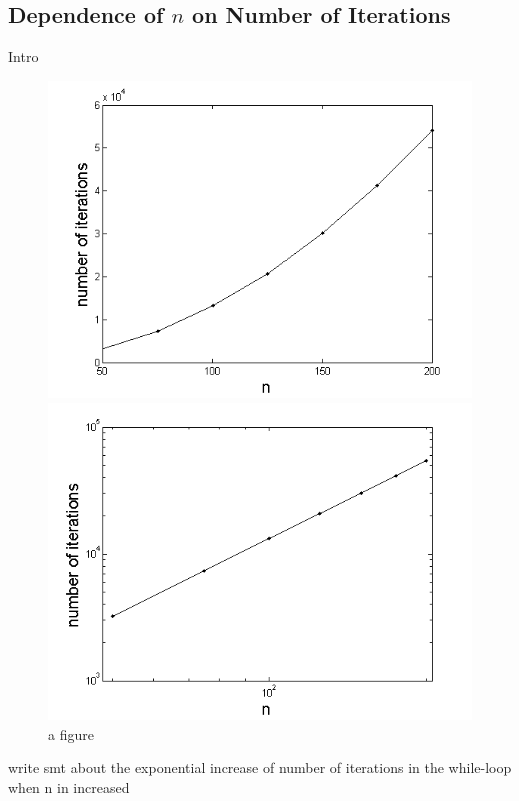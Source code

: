 \subsection{Dependence of $n$ on Number of Iterations}
\label{subsec:DependenceOnNumberOfIterations}

Intro

\begin{figure}[H]
\centering
\begin{minipage}{.5\textwidth}
  \centering
  \includegraphics[width=1\linewidth]{Figures/NumberOfIterations.png}
\end{minipage}%
\begin{minipage}{.5\textwidth}
  \centering
  \includegraphics[width=1\linewidth]{Figures/NumberOfIterationsloglog.png}
\end{minipage}
\caption{a figure}
\label{fig:DependenceOnNumberOfIterations1}
\end{figure}

write smt about the exponential increase of number of iterations in the while-loop when n in increased
